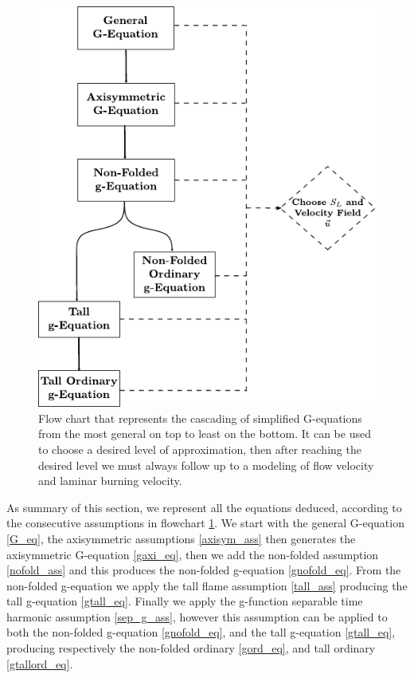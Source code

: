 \begin{figure}[!h]
\begin{center}
\includegraphics[scale=1.2]{./img/equation_flowchart}
\end{center}
\caption{Flow chart that represents the cascading of simplified G-equations from the most general on top to least on the bottom. It can be used to choose a desired level of approximation, then after reaching the desired level we must always follow up to a modeling of flow velocity and laminar burning velocity.}
\label{equation_flowchart}
\end{figure}
\vspace{8mm}
As summary of this section, we represent all the equations deduced, according to the consecutive assumptions in flowchart \ref{equation_flowchart}. We start with the general G-equation \eqref{G_eq}, the axisymmetric assumptions \ref{axisym_ass} then generates the axisymmetric G-equation \eqref{gaxi_eq}, then we add the non-folded assumption \ref{nofold_ass} and this produces the non-folded g-equation \eqref{gnofold_eq}. From the non-folded g-equation we apply the tall flame assumption \ref{tall_ass} producing the tall g-equation \eqref{gtall_eq}. Finally we apply the g-function separable time harmonic assumption \ref{sep_g_ass}, however this assumption can be applied to both the non-folded g-equation \eqref{gnofold_eq}, and the tall g-equation \eqref{gtall_eq}, producing respectively the non-folded ordinary \eqref{gord_eq}, and tall ordinary \eqref{gtallord_eq}.




